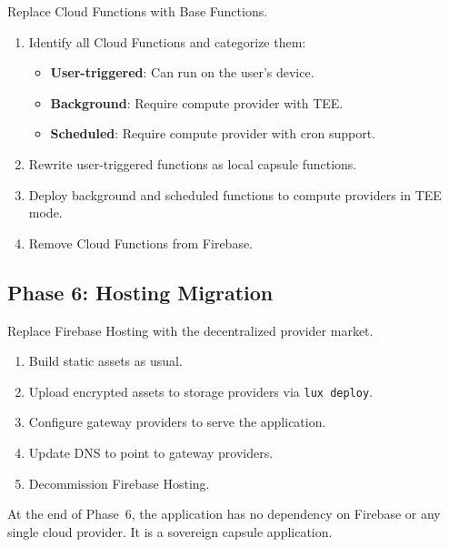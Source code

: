 Replace Cloud Functions with Base Functions.

\begin{enumerate}
    \item Identify all Cloud Functions and categorize them:
    \begin{itemize}
        \item \textbf{User-triggered}: Can run on the user's device.
        \item \textbf{Background}: Require compute provider with TEE.
        \item \textbf{Scheduled}: Require compute provider with cron support.
    \end{itemize}
    \item Rewrite user-triggered functions as local capsule functions.
    \item Deploy background and scheduled functions to compute providers in TEE mode.
    \item Remove Cloud Functions from Firebase.
\end{enumerate}

\subsection{Phase 6: Hosting Migration}

Replace Firebase Hosting with the decentralized provider market.

\begin{enumerate}
    \item Build static assets as usual.
    \item Upload encrypted assets to storage providers via \texttt{lux deploy}.
    \item Configure gateway providers to serve the application.
    \item Update DNS to point to gateway providers.
    \item Decommission Firebase Hosting.
\end{enumerate}

At the end of Phase~6, the application has no dependency on Firebase or any
single cloud provider. It is a sovereign capsule application.

